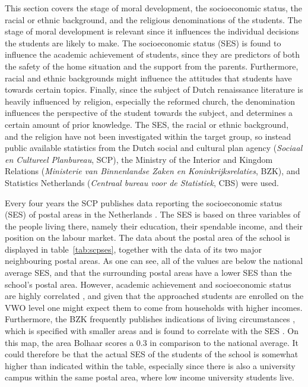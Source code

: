 This section covers the stage of moral development, the socioeconomic status, the racial or ethnic background, and the religious denominations of the students. The stage of moral development is relevant since it influences the individual decisions the students are likely to make. The socioeconomic status (SES) is found to influence the academic achievement of students, since they are predictors of both the safety of the home situation and the support from the parents. Furthermore, racial and ethnic backgrounds might influence the attitudes that students have towards certain topics. Finally, since the subject of Dutch renaissance literature is heavily influenced by religion, especially the reformed church, the denomination influences the perspective of the student towards the subject, and determines a certain amount of prior knowledge. The SES, the racial or ethnic background, and the religion have not been investigated within the target group, so instead public available statistics from the Dutch social and cultural plan agency (\emph{Sociaal en Cultureel Planbureau}, SCP), the Ministry of the Interior and Kingdom Relations (\emph{Ministerie van Binnenlandse Zaken en Koninkrijksrelaties}, BZK),  and Statistics Netherlands (\emph{Centraal bureau voor de Statistiek}, CBS) were used.


Every four years the SCP publishes data reporting the socioeconomic status (SES) of postal areas in the Netherlands \cite{scp}. The SES is based on three variables of the people living there, namely their education, their spendable income, and their position on the labour market. The data about the postal area of the school is displayed in table~\ref{tab:scpses}, together with the data of its two major neighbouring postal areas. As one can see, all of the values are below the national average SES, and that the surrounding postal areas have a lower SES than the school's postal area. However, academic achievement and socioeconomic status are highly correlated \cite{academicsocioeconomic}, and given that the approached students are enrolled on the VWO level one might expect them to come from households with higher incomes. Furthermore, the BZK frequently publishes indications of living circumstances \cite{bzk}, which is specified with smaller areas and is found to correlate with the SES \cite{knol}. On this map, the area Bolhaar scores a 0.3 in comparison to the national average. It could therefore be that the actual SES of the students of the school is somewhat higher than indicated within the table, especially since there is also a university campus within the same postal area, where low income university students live.

